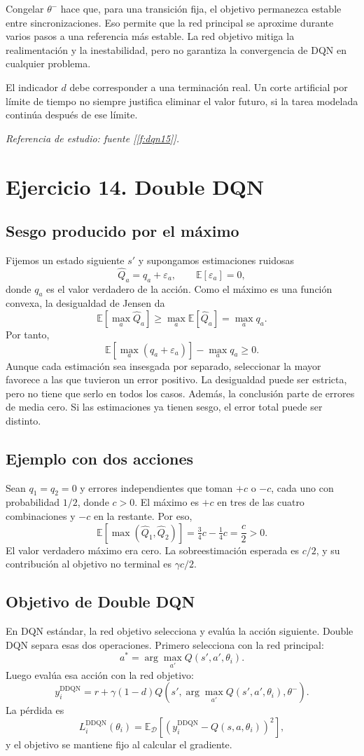 \documentclass[11pt,a4paper]{article}
\newcommand{\E}{\mathbb{E}}
\newcommand{\apartado}[1]{\subsection*{#1}}
\begin{document}
Congelar $\theta^-$ hace que, para una transición fija, el objetivo permanezca estable entre sincronizaciones. Eso permite que la red principal se aproxime durante varios pasos a una referencia más estable. La red objetivo mitiga la realimentación y la inestabilidad, pero no garantiza la convergencia de DQN en cualquier problema.

El indicador $d$ debe corresponder a una terminación real. Un corte artificial por límite de tiempo no siempre justifica eliminar el valor futuro, si la tarea modelada continúa después de ese límite.

\textit{Referencia de estudio: fuente [\ref{f:dqn15}].}

\section{Ejercicio 14. Double DQN}

\apartado{Sesgo producido por el máximo}
Fijemos un estado siguiente $s'$ y supongamos estimaciones ruidosas
\[
\widehat Q_a=q_a+\varepsilon_a,\qquad \E[\varepsilon_a]=0,
\]
donde $q_a$ es el valor verdadero de la acción. Como el máximo es una función convexa, la desigualdad de Jensen da
\[
\E\left[\max_a\widehat Q_a\right]
\geq\max_a\E[\widehat Q_a]=\max_a q_a.
\]
Por tanto,
\[
\boxed{\E[\max_a(q_a+\varepsilon_a)]-\max_a q_a\geq0.}
\]
Aunque cada estimación sea insesgada por separado, seleccionar la mayor favorece a las que tuvieron un error positivo. La desigualdad puede ser estricta, pero no tiene que serlo en todos los casos. Además, la conclusión parte de errores de media cero. Si las estimaciones ya tienen sesgo, el error total puede ser distinto.

\apartado{Ejemplo con dos acciones}
Sean $q_1=q_2=0$ y errores independientes que toman $+c$ o $-c$, cada uno con probabilidad $1/2$, donde $c>0$. El máximo es $+c$ en tres de las cuatro combinaciones y $-c$ en la restante. Por eso,
\[
\E[\max(\widehat Q_1,\widehat Q_2)]
=\tfrac34c-\tfrac14c=\frac c2>0.
\]
El valor verdadero máximo era cero. La sobreestimación esperada es $c/2$, y su contribución al objetivo no terminal es $\gamma c/2$.

\apartado{Objetivo de Double DQN}
En DQN estándar, la red objetivo selecciona y evalúa la acción siguiente. Double DQN separa esas dos operaciones. Primero selecciona con la red principal:
\[
a^*=\arg\max_{a'}Q(s',a',\theta_i).
\]
Luego evalúa esa acción con la red objetivo:
\[
\boxed{y_i^{\mathrm{DDQN}}=r+\gamma(1-d)
Q\left(s',\arg\max_{a'}Q(s',a',\theta_i),\theta^-\right).}
\]
La pérdida es
\[
L_i^{\mathrm{DDQN}}(\theta_i)
=\E_{\mathcal D}\left[(y_i^{\mathrm{DDQN}}-Q(s,a,\theta_i))^2\right],
\]
y el objetivo se mantiene fijo al calcular el gradiente.
\end{document}
